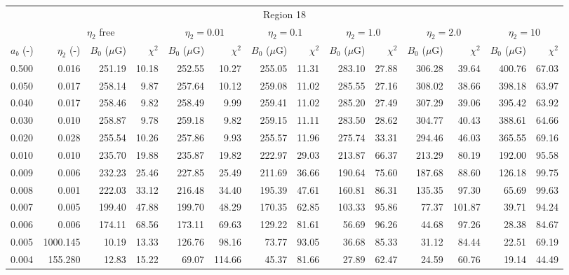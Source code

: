 \begin{tabular}{@{}lrrrrrrrrrrrrr@{}}
\toprule
\multicolumn{14}{c}{Region 18} \\
\cmidrule{1-14}
{} & \multicolumn{3}{c}{$\eta_2$ free} & \multicolumn{2}{c}{$\eta_2 = 0.01$}
   & \multicolumn{2}{c}{$\eta_2 = 0.1$} & \multicolumn{2}{c}{$\eta_2 = 1.0$}
   & \multicolumn{2}{c}{$\eta_2 = 2.0$} & \multicolumn{2}{c}{$\eta_2 = 10$} \\
\cmidrule(lr){2-4} \cmidrule(lr){5-6} \cmidrule(lr){7-8} \cmidrule(lr){9-10}
    \cmidrule(lr){11-12} \cmidrule(lr){13-14}
$a_b$ (-) & $\eta_2$ (-) & $B_0$ ($\mu$G) & $\chi^2$
& $B_0$ ($\mu$G) & $\chi^2$ & $B_0$ ($\mu$G) & $\chi^2$
& $B_0$ ($\mu$G) & $\chi^2$ & $B_0$ ($\mu$G) & $\chi^2$
& $B_0$ ($\mu$G) & $\chi^2$ \\
\cmidrule{1-14}
0.500 & 0.016 & 251.19 & 10.18 & 252.55 & 10.27 & 255.05 & 11.31 & 283.10 & 27.88 & 306.28 & 39.64 & 400.76 & 67.03 \\
0.050 & 0.017 & 258.14 & 9.87 & 257.64 & 10.12 & 259.08 & 11.02 & 285.55 & 27.16 & 308.02 & 38.66 & 398.18 & 63.97 \\
0.040 & 0.017 & 258.46 & 9.82 & 258.49 & 9.99 & 259.41 & 11.02 & 285.20 & 27.49 & 307.29 & 39.06 & 395.42 & 63.92 \\
0.030 & 0.010 & 258.87 & 9.78 & 259.18 & 9.82 & 259.15 & 11.11 & 283.50 & 28.62 & 304.77 & 40.43 & 388.61 & 64.66 \\
0.020 & 0.028 & 255.54 & 10.26 & 257.86 & 9.93 & 255.57 & 11.96 & 275.74 & 33.31 & 294.46 & 46.03 & 365.55 & 69.16 \\
0.010 & 0.010 & 235.70 & 19.88 & 235.87 & 19.82 & 222.97 & 29.03 & 213.87 & 66.37 & 213.29 & 80.19 & 192.00 & 95.58 \\
0.009 & 0.006 & 232.23 & 25.46 & 227.85 & 25.49 & 211.69 & 36.66 & 190.64 & 75.60 & 187.68 & 88.60 & 126.18 & 99.75 \\
0.008 & 0.001 & 222.03 & 33.12 & 216.48 & 34.40 & 195.39 & 47.61 & 160.81 & 86.31 & 135.35 & 97.30 & 65.69 & 99.63 \\
0.007 & 0.005 & 199.40 & 47.88 & 199.70 & 48.29 & 170.35 & 62.85 & 103.33 & 95.86 & 77.37 & 101.87 & 39.71 & 94.24 \\
0.006 & 0.006 & 174.11 & 68.56 & 173.11 & 69.63 & 129.22 & 81.61 & 56.69 & 96.26 & 44.68 & 97.26 & 28.38 & 84.67 \\
0.005 & 1000.145 & 10.19 & 13.33 & 126.76 & 98.16 & 73.77 & 93.05 & 36.68 & 85.33 & 31.12 & 84.44 & 22.51 & 69.19 \\
0.004 & 155.280 & 12.83 & 15.22 & 69.07 & 114.66 & 45.37 & 81.66 & 27.89 & 62.47 & 24.59 & 60.76 & 19.14 & 44.49 \\


\end{tabular}
